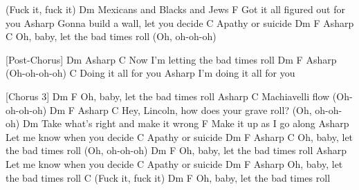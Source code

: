 \begin{guitar}
	(Fuck it, fuck it)
	Dm
	Mexicans and Blacks and Jews
	F
	Got it all figured out for you
	Asharp
	Gonna build a wall, let you decide
	C
	Apathy or suicide
	Dm               F              Asharp         C
	Oh, baby, let the bad times roll (Oh, oh-oh-oh)
	
	
	[Post-Chorus]
	Dm  Asharp C
	Now I'm letting the bad times roll
	Dm F Asharp
	(Oh-oh-oh-oh)
	C
	Doing it all for you
	Asharp
	I'm doing it all for you
	
	
	[Chorus 3]
	Dm               F
	Oh, baby, let the bad times roll
	Asharp           C
	Machiavelli flow (Oh-oh-oh-oh)
	Dm                    F                Asharp        C
	Hey, Lincoln, how does your grave roll? (Oh, oh-oh-oh)
	Dm
	Take what’s right and make it wrong
	F
	Make it up as I go along
	Asharp
	Let me know when you decide
	C
	Apathy or suicide
	Dm               F              Asharp         C
	Oh, baby, let the bad times roll (Oh, oh-oh-oh)
	Dm               F
	Oh, baby, let the bad times roll
	Asharp
	Let me know when you decide
	C
	Apathy or suicide
	Dm               F             Asharp
	Oh, baby, let the bad times roll
	C
	(Fuck it, fuck it)
	Dm               F
	Oh, baby, let the bad times roll
\end{guitar}